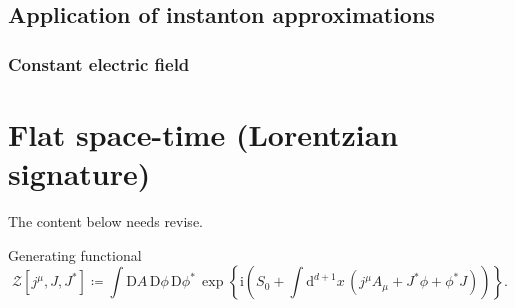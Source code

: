 \documentclass[12pt]{article}
\newcommand\mi{\mathrm{i}} %
\newcommand\dif{\mathrm{d}}
\newcommand\Dif{\mathrm{D}}
\newcommand{\rbr}[1]{{\left(#1\right)}}
\newcommand{\sfun}[2]{{#1}\mathopen{}\left[#2\right]\mathclose{}}
\newcommand{\cfun}[2]{{#1}\mathopen{}\left\{#2\right\}\mathclose{}}
\begin{document}
\subsection{Application of instanton approximations}
\label{ssec:eucl-appl}

\cite{Dunne2005}

\subsubsection{Constant electric field}
\label{ssec:eucl-appl-cons}





\section{Flat space-time (Lorentzian signature)}


The content below needs revise.

Generating functional
\begin{equation}
\sfun{\mathcal{Z}}{j^\mu, J, J^*} \coloneqq
\int\Dif A\,\Dif\phi\,\Dif\phi^*\,\cfun{\exp}{\mi\rbr{S_0
+\int\dif^{d+1} x\,\rbr{j^\mu A_\mu + J^* \phi+\phi^* J}}}.
\end{equation}
\end{document}
